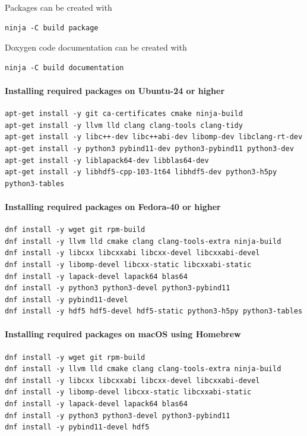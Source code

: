 \noindent
Packages can be created with
\begin{framed}
\begin{verbatim}
ninja -C build package
\end{verbatim}
\end{framed}

\noindent
Doxygen code documentation can be created with
\begin{framed}
\begin{verbatim}
ninja -C build documentation
\end{verbatim}
\end{framed}

\paragraph{Installing required packages on Ubuntu-24 or higher}

\begin{verbatim}
apt-get install -y git ca-certificates cmake ninja-build
apt-get install -y llvm lld clang clang-tools clang-tidy
apt-get install -y libc++-dev libc++abi-dev libomp-dev libclang-rt-dev
apt-get install -y python3 pybind11-dev python3-pybind11 python3-dev
apt-get install -y liblapack64-dev libblas64-dev
apt-get install -y libhdf5-cpp-103-1t64 libhdf5-dev python3-h5py python3-tables
\end{verbatim}

\paragraph{Installing required packages on Fedora-40 or higher}

\begin{verbatim}
dnf install -y wget git rpm-build
dnf install -y llvm lld cmake clang clang-tools-extra ninja-build
dnf install -y libcxx libcxxabi libcxx-devel libcxxabi-devel 
dnf install -y libomp-devel libcxx-static libcxxabi-static
dnf install -y lapack-devel lapack64 blas64
dnf install -y python3 python3-devel python3-pybind11
dnf install -y pybind11-devel
dnf install -y hdf5 hdf5-devel hdf5-static python3-h5py python3-tables
\end{verbatim}

\paragraph{Installing required packages on macOS using Homebrew}

\begin{verbatim}
dnf install -y wget git rpm-build
dnf install -y llvm lld cmake clang clang-tools-extra ninja-build
dnf install -y libcxx libcxxabi libcxx-devel libcxxabi-devel
dnf install -y libomp-devel libcxx-static libcxxabi-static
dnf install -y lapack-devel lapack64 blas64
dnf install -y python3 python3-devel python3-pybind11
dnf install -y pybind11-devel hdf5
\end{verbatim}

